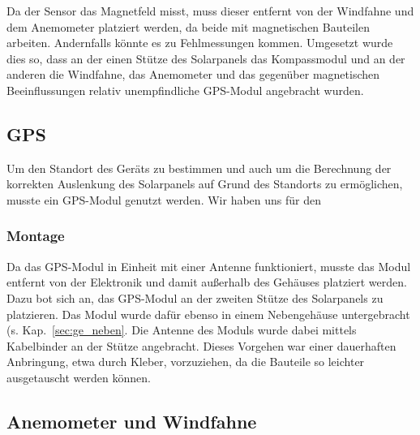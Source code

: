Da der Sensor das Magnetfeld misst, muss dieser entfernt von der Windfahne und dem Anemometer platziert werden, da beide mit magnetischen Bauteilen arbeiten. Andernfalls könnte es zu Fehlmessungen kommen. Umgesetzt wurde dies so, dass an der einen Stütze des Solarpanels das Kompassmodul und an der anderen die Windfahne, das Anemometer und das gegenüber magnetischen Beeinflussungen relativ unempfindliche GPS-Modul angebracht wurden.



\subsection{GPS} %

Um den Standort des Geräts zu bestimmen und auch um die Berechnung der korrekten Auslenkung des Solarpanels auf Grund des Standorts zu ermöglichen, musste ein GPS-Modul genutzt werden. Wir haben uns für den %

\subsubsection{Montage}

Da das GPS-Modul in Einheit mit einer Antenne funktioniert, musste das Modul entfernt von der Elektronik und damit außerhalb des Gehäuses platziert werden. Dazu bot sich an, das GPS-Modul an der zweiten Stütze des Solarpanels zu platzieren. Das Modul wurde dafür ebenso in einem Nebengehäuse untergebracht (s. Kap.~\ref{sec:ge_neben}. Die Antenne des Moduls wurde dabei mittels Kabelbinder an der Stütze angebracht. Dieses Vorgehen war einer dauerhaften Anbringung, etwa durch Kleber, vorzuziehen, da die Bauteile so leichter ausgetauscht werden können.


\subsection{Anemometer und Windfahne}



